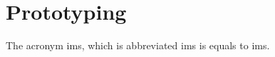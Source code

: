 \chapter{Prototyping}
\label{sec:prototyping}
\thispagestyle{fancy}

The acronym \acrlong{ims}, which is abbreviated \acrshort{ims} is equals to \acrfull{ims}.

\lipsum[4]

\clearemptydoublepage